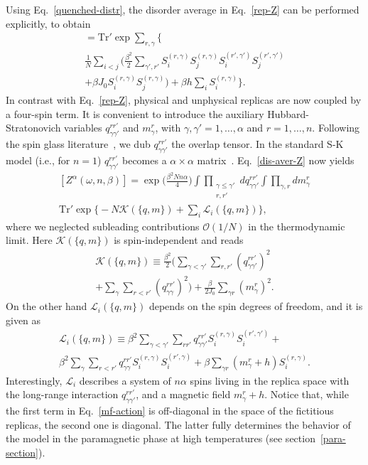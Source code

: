 \documentclass[twocolumn,superscriptaddress,prb,10pt]{revtex4-1}
\def\tr{\textrm{Tr}}
\begin{document}
Using Eq.~\eqref{quenched-distr}, the disorder average in Eq.~\eqref{rep-Z} 
can be performed explicitly, to obtain 
%
\begin{multline}
[Z^\alpha(\omega,n,\beta)]=\tr'\exp\sum\limits_{r,\gamma}\Big\{\\
\frac{1}{N}
\sum\limits_{i<j}\Big(
\frac{\beta^2}{2}\sum\limits_{\gamma',r'}S^{(r,\gamma)}_iS^{(r,\gamma)}_j
S^{(r',\gamma')}_iS^{(r',\gamma')}_j\\
+\beta J_0 S_i^{(r,\gamma)}S_j^{(r,\gamma)}\Big)
+\beta h\sum\limits_{i}
S_i^{(r,\gamma)}\Big\}.
\label{dis-aver-Z}
\end{multline}
%
In contrast with Eq.~\eqref{rep-Z}, physical and unphysical replicas are 
now coupled by a four-spin term. It is convenient to introduce the auxiliary 
Hubbard-Stratonovich variables $q_{\gamma\gamma'}^{rr'}$ and $m_\gamma^r$, 
with $\gamma,\gamma'=1,\dots,\alpha$ and $r=1,\dots,n$. Following the spin 
glass literature~\cite{parisi-book}, we dub $q_{\gamma\gamma'}^{rr'}$ the 
overlap tensor. In the standard S-K model (i.e., for $n=1$) 
$q_{\gamma\gamma'}^{rr'}$ becomes a $\alpha\times\alpha$ 
matrix~\cite{sherrington-1978-prl}. Eq.~\eqref{dis-aver-Z} now 
yields  
%
\begin{multline}
\label{hs-Z}
[Z^\alpha(\omega,n,\beta)]=\exp\Big(\frac{\beta^2Nn\alpha}{4}\Big)
\int\prod_{\substack{\gamma\le\gamma'\\r,r'}}
dq^{rr'}_{\gamma\gamma'}
\int\prod_{\gamma,r}dm_\gamma^r\\
\tr'\exp
\Big\{-N {\mathcal K}(\{q,m\})
+\sum_i{\mathcal L}_i(\{q,m\})\Big\},
\end{multline}
%
where we neglected subleading contributions ${\mathcal O}(1/N)$ in 
the thermodynamic limit. Here ${\mathcal K}(\{q,m\})$ is spin-independent 
and reads 
%
\begin{multline}
{\mathcal K}(\{q,m\})\equiv 
\frac{\beta^2}{2}\Big(\sum\limits_{\gamma<\gamma'}\sum
\limits_{r,r'} (q_{\gamma\gamma'}^{rr'})^2
\\
+\sum\limits_{\gamma}\sum\limits_{r<r'}(q_{\gamma\gamma}^{
rr'})^2\Big)
+\frac{\beta}{2 J_0}\sum\limits_{\gamma r}(m_\gamma^r)^2. 
\label{Gamma}
\end{multline}
%
On the other hand ${\mathcal L}_i(\{q,m\})$ depends on the spin degrees of 
freedom, and it is given as   
%
\begin{multline}
{\mathcal L}_i(\{q,m\})
\equiv\beta^2\sum\limits_{\gamma<\gamma'}\sum\limits_{rr'}
q_{\gamma\gamma'}^{rr'}S_i^{(r,\gamma)}
S_i^{(r',\gamma')}+\\
\beta^2\sum_\gamma\sum\limits_{r<r'}
q_{\gamma\gamma}^{rr'}S^{(r,\gamma)}_i
S^{(r',\gamma)}_i
+\beta\sum\limits_{\gamma r}(m_\gamma^r+h)
S_i^{(r,\gamma)}.
\label{mf-action}
\end{multline}
%
Interestingly, ${\mathcal L}_i$ describes a system of $n\alpha$ spins living 
in the replica space with the long-range interaction $q_{\gamma\gamma'}^{rr'}$, 
and a magnetic field $m_\gamma^r+h$. Notice that, while the first term in 
Eq.~\eqref{mf-action} is off-diagonal in the space of the fictitious replicas, 
the second one is diagonal. The latter fully determines the behavior of the model 
in the paramagnetic phase at high temperatures (see section~\ref{para-section}). 
\end{document}
